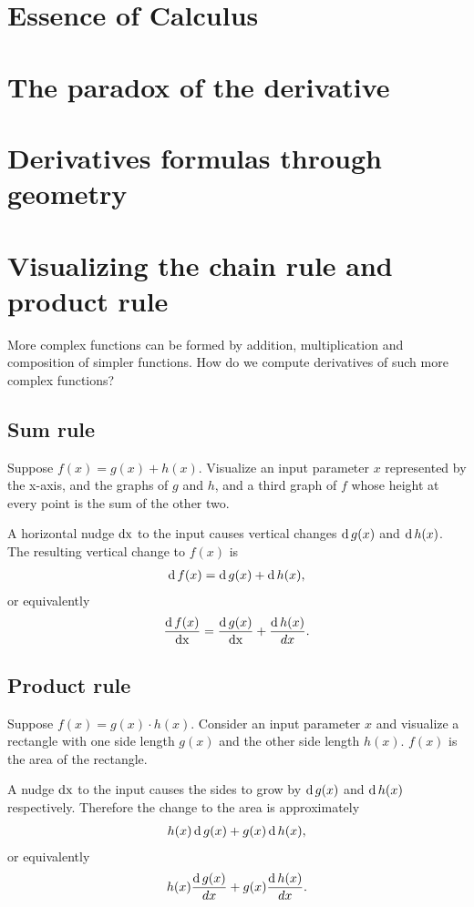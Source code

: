 \documentclass[12pt]{article}
\begin{document}
\section{Essence of Calculus}
\section{The paradox of the derivative}
\section{Derivatives formulas through geometry}
\section{Visualizing the chain rule and product rule}

More complex functions can be formed by addition, multiplication and
composition of simpler functions. How do we compute derivatives of such more
complex functions?

\subsection{Sum rule}
Suppose $f(x) = g(x) + h(x)$. Visualize an input parameter $x$ represented by
the x-axis, and the graphs of $g$ and $h$, and a third graph of $f$ whose
height at every point is the sum of the other two.

A horizontal nudge $\operatorname{\text{dx}}$ to the input causes vertical changes $\operatorname{\text{d}} g(x)$ and
$\operatorname{\text{d}} h(x)$. The resulting vertical change to $f(x)$ is
\begin{align*}
  \operatorname{\text{d}} f(x) = \operatorname{\text{d}} g(x) + \operatorname{\text{d}} h(x),
\end{align*}
or equivalently
\begin{align*}
  \frac{\operatorname{\text{d}} f(x)}{\operatorname{\text{dx}}} = \frac{\operatorname{\text{d}} g(x)}{\operatorname{\text{dx}}} + \frac{\operatorname{\text{d}} h(x)}{dx}.
\end{align*}


\subsection{Product rule}
Suppose $f(x) = g(x) \cdot h(x)$. Consider an input parameter $x$ and visualize a
rectangle with one side length $g(x)$ and the other side length $h(x)$. $f(x)$
is the area of the rectangle.

A nudge $\operatorname{\text{dx}}$ to the input causes the sides to grow by $\operatorname{\text{d}} g(x)$ and $\operatorname{\text{d}} h(x)$
respectively. Therefore the change to the area is approximately
\begin{align*}
  h(x) \operatorname{\text{d}} g(x) + g(x) \operatorname{\text{d}} h(x),
\end{align*}
or equivalently
\begin{align*}
  h(x) \frac{\operatorname{\text{d}} g(x)}{dx} + g(x) \frac{\operatorname{\text{d}} h(x)}{dx}.
\end{align*}
\end{document}
